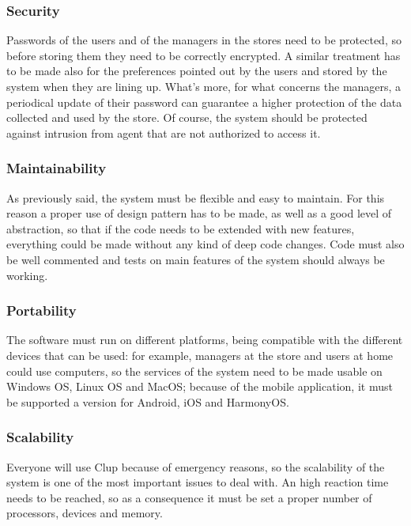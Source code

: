 \documentclass[]{article}
\begin{document}
			\subsubsection{Security}
			
			Passwords of the users and of the managers in the stores need to be protected, so before storing them they need to be correctly encrypted. A similar treatment has to be made also for the preferences pointed out by the users and stored by the system when they are lining up. What’s more,  for what concerns the managers, a periodical update of their password can guarantee a higher protection of the data collected and used by the store. Of course, the system should be protected against intrusion from agent that are not authorized to access it. \\
			
			\subsubsection{Maintainability}
			
			As previously said, the system must be flexible and easy to maintain. For this reason a proper use of design pattern has to be made, as well as a good level of abstraction, so that if the code needs to be extended with new features, everything could be made without any kind of deep code changes. Code must also be well commented and tests on main features of the system should always be working.\\
			
			\subsubsection{Portability}

			The software must run on different platforms, being compatible with the different devices that can be used: for example, managers at the store and users at home could use computers, so the services of the system need to be made usable on Windows OS, Linux OS and MacOS; because of the mobile application, it must be supported a version for Android, iOS and HarmonyOS.\\
			
			\subsubsection{Scalability}

			Everyone will use Clup because of emergency reasons, so the scalability of the system is one of the most important issues to deal with. An high reaction time needs to be reached, so as a consequence it must be set a proper number of processors, devices and memory.\\
\end{document}

